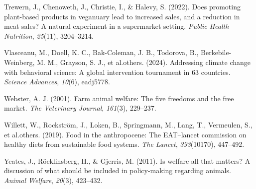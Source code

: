 \documentclass[
  man]{apa6}
\newlength{\cslhangindent}
\newenvironment{CSLReferences}[2] %
 {\begin{list}{}{%
  \setlength{\itemindent}{0pt}
  \setlength{\leftmargin}{0pt}
  \setlength{\parsep}{0pt}
  \ifodd #1
   \setlength{\leftmargin}{\cslhangindent}
   \setlength{\itemindent}{-1\cslhangindent}
  \fi
  \setlength{\itemsep}{#2\baselineskip}}}
 {\end{list}}
\begin{document}
\begin{CSLReferences}{1}{0}
Trewern, J., Chenoweth, J., Christie, I., \& Halevy, S. (2022). Does promoting plant-based products in veganuary lead to increased sales, and a reduction in meat sales? A natural experiment in a supermarket setting. \emph{Public Health Nutrition}, \emph{25}(11), 3204--3214.

Vlasceanu, M., Doell, K. C., Bak-Coleman, J. B., Todorova, B., Berkebile-Weinberg, M. M., Grayson, S. J., et al.others. (2024). Addressing climate change with behavioral science: A global intervention tournament in 63 countries. \emph{Science Advances}, \emph{10}(6), eadj5778.

Webster, A. J. (2001). Farm animal welfare: The five freedoms and the free market. \emph{The Veterinary Journal}, \emph{161}(3), 229--237.

Willett, W., Rockström, J., Loken, B., Springmann, M., Lang, T., Vermeulen, S., et al.others. (2019). Food in the anthropocene: The EAT--lancet commission on healthy diets from sustainable food systems. \emph{The Lancet}, \emph{393}(10170), 447--492.

Yeates, J., Röcklinsberg, H., \& Gjerris, M. (2011). Is welfare all that matters? A discussion of what should be included in policy-making regarding animals. \emph{Animal Welfare}, \emph{20}(3), 423--432.

\end{CSLReferences}
\end{document}

